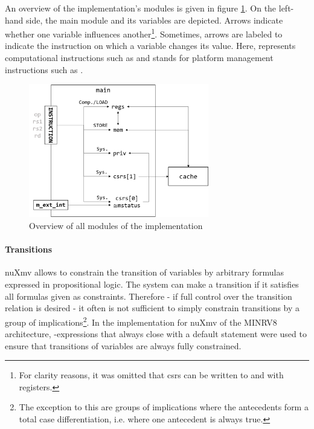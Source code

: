 An overview of the implementation's modules is given in figure \ref{fig:modules-overview}.
On the left-hand side, the main module and its variables are depicted.
Arrows indicate whether one variable influences another\footnote{%
    For clarity reasons, it was omitted that \glspl{csr} can be written to and with registers.
}.
Sometimes, arrows are labeled to indicate the instruction on which a variable changes its value.
Here,  represents computational instructions such as  and  stands for platform management instructions such as .

\begin{figure}
    \centering
    \includegraphics[width=0.7\textwidth]{figures/modules-overview.png}
    \caption{Overview of all modules of the implementation}
    \label{fig:modules-overview}
\end{figure}

\paragraph{Transitions}
nuXmv allows to constrain the transition of variables by arbitrary formulas expressed in propositional logic.
The system can make a transition if it satisfies all formulas given as constraints.
Therefore - if full control over the transition relation is desired - it often is not sufficient to simply constrain transitions by a group of implications\footnote{%
    The exception to this are groups of implications where the antecedents form a total case differentiation, i.e. where one antecedent is always true.
}.
In the implementation for nuXmv of the MINRV8 architecture, -expressions that always close with a default statement were used to ensure that transitions of variables are always fully constrained.

